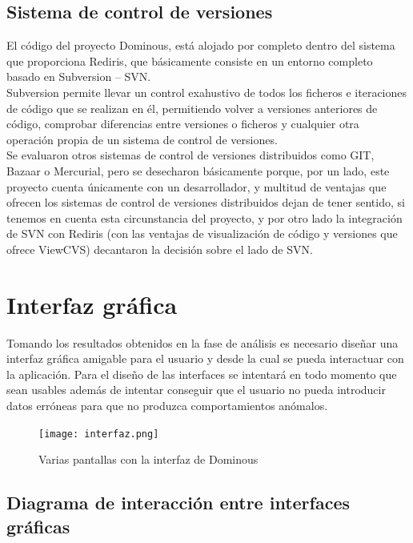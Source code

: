 \subsection{Sistema de control de versiones}

El código del proyecto Dominous, está alojado por completo dentro del sistema que proporciona Rediris, que básicamente
consiste en un entorno completo basado en Subversion -- SVN. \\ 

Subversion permite llevar un control exahustivo de todos los ficheros e iteraciones de código que se realizan en él,
permitiendo volver a versiones anteriores de código, comprobar diferencias entre versiones o ficheros y cualquier otra
operación propia de un sistema de control de versiones. \\

Se evaluaron otros sistemas de control de versiones distribuidos como GIT, Bazaar o Mercurial, pero se desecharon
básicamente porque, por un lado, este proyecto cuenta únicamente con un desarrollador, y multitud de ventajas que
ofrecen los sistemas de control de versiones distribuidos dejan de tener sentido, si tenemos en cuenta esta circunstancia
del proyecto, y por otro lado la integración de SVN con Rediris (con las ventajas de visualización de código y versiones
que ofrece ViewCVS) decantaron la decisión sobre el lado de SVN.

\section{Interfaz gráfica}

Tomando los resultados obtenidos en la fase de análisis es necesario diseñar una interfaz gráfica amigable
para el usuario y desde la cual se pueda interactuar con la aplicación. Para el diseño de las interfaces
se intentará en todo momento que sean usables además de intentar conseguir que el usuario no pueda
introducir datos erróneas para que no produzca comportamientos anómalos. \\

\begin{figure}[h]
  \label{fig:pantallas_interfaz}
  \begin{center}
    \texttt{[image: interfaz.png]}
  \end{center}
  \caption{Varias pantallas con la interfaz de Dominous}
\end{figure}

\subsection{Diagrama de interacción entre interfaces gráficas}

